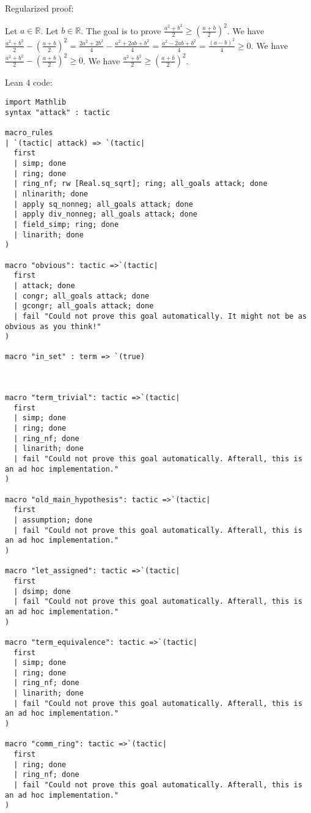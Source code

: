 \documentclass{article}
\begin{document}
Regularized proof:
\begin{tcolorbox}[colback=red!10, width=\linewidth]
Let $a\in\mathbb{R}$.
Let $b\in\mathbb{R}$.
The goal is to prove $\frac{a^2+b^2}{2} \ge {\left(\frac{a+b}{2}\right)}^2$.
We have $\frac{a^2+b^2}{2} - {\left(\frac{a+b}{2}\right)}^2 = \frac{2a^2+2b^2}{4} - \frac{a^2+2ab+b^2}{4} = \frac{a^2-2ab+b^2}{4} = \frac{{{(a-b)}}^2}{4} \ge 0$.
We have $\frac{a^2+b^2}{2} - {\left(\frac{a+b}{2}\right)}^2 \ge 0$.
We have $\frac{a^2+b^2}{2} \ge {\left(\frac{a+b}{2}\right)}^2$.
\end{tcolorbox}

Lean 4 code:
\begin{tcolorbox}[colback=white!10, width=\linewidth]
\begin{lstlisting}[language=Lean4]
import Mathlib
syntax "attack" : tactic

macro_rules
| `(tactic| attack) => `(tactic|
  first
  | simp; done
  | ring; done
  | ring_nf; rw [Real.sq_sqrt]; ring; all_goals attack; done
  | nlinarith; done
  | apply sq_nonneg; all_goals attack; done
  | apply div_nonneg; all_goals attack; done
  | field_simp; ring; done
  | linarith; done
)

macro "obvious": tactic =>`(tactic|
  first
  | attack; done
  | congr; all_goals attack; done
  | gcongr; all_goals attack; done
  | fail "Could not prove this goal automatically. It might not be as obvious as you think!"
)

macro "in_set" : term => `(true)



macro "term_trivial": tactic =>`(tactic|
  first
  | simp; done
  | ring; done
  | ring_nf; done
  | linarith; done
  | fail "Could not prove this goal automatically. Afterall, this is an ad hoc implementation."
)

macro "old_main_hypothesis": tactic =>`(tactic|
  first
  | assumption; done
  | fail "Could not prove this goal automatically. Afterall, this is an ad hoc implementation."
)

macro "let_assigned": tactic =>`(tactic|
  first
  | dsimp; done
  | fail "Could not prove this goal automatically. Afterall, this is an ad hoc implementation."
)

macro "term_equivalence": tactic =>`(tactic|
  first
  | simp; done
  | ring; done
  | ring_nf; done
  | linarith; done
  | fail "Could not prove this goal automatically. Afterall, this is an ad hoc implementation."
)

macro "comm_ring": tactic =>`(tactic|
  first
  | ring; done
  | ring_nf; done
  | fail "Could not prove this goal automatically. Afterall, this is an ad hoc implementation."
)


\end{lstlisting}
\end{tcolorbox}
\end{document}

